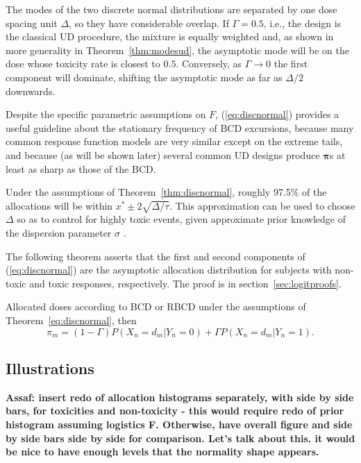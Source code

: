 The modes of the two discrete normal distributions are separated by one dose spacing unit $\Delta$, so they have considerable overlap. If $\Gamma=0.5$, i.e., the design is the classical UD procedure, the mixture is equally weighted and, as shown in more generality in Theorem~\ref{thm:modesud}, the asymptotic mode will be on the dose whose toxicity rate is closest to $0.5$. Conversely, as $\Gamma\to 0$ the first component will dominate, shifting the asymptotic mode as far as $\Delta/2$ downwards.

Despite the specific parametric assumptions on $F$,  (\ref{eq:discnormal}) provides a useful guideline about the stationary frequency of BCD excursions, because many common response function models are very similar except on the extreme tails, and because (as will be shown later) several common UD designs produce $\boldsymbol{\pi}$s at least as sharp as those of the BCD.

Under the assumptions of Theorem~\ref{thm:discnormal}, roughly 97.5\% of the allocations will be within $x^*\pm 2\sqrt{\Delta/\tau}$.  This approximation can be used to choose $\Delta$ so as to control for highly toxic events, given approximate prior knowledge of the dispersion parameter $\sigma$ \citep{Durh:Flou:Rose:rand:1997}.

The following theorem asserts that the first and second components of (\ref{eq:discnormal}) are the asymptotic allocation distribution for subjects with non-toxic and toxic responses, respectively.  The proof is in section~\ref{sec:logitproofs}.
\begin{thm}\label{thm:logitpi|y}
Allocated doses according to BCD or RBCD under the assumptions of Theorem~\ref{eq:discnormal}, then
\begin{equation}
\pi_m=(1-\Gamma)P(X_n=d_m|Y_n=0)+\Gamma P(X_n=d_m|Y_n=1).
\end{equation}
\end{thm}


\subsection{Illustrations}
{\bf Assaf: insert redo of allocation histograms separately, with side by side bars, for toxicities and non-toxicity - this would require redo of prior histogram assuming logistics F.  Otherwise, have overall figure and side by side bars side by side for comparison.  Let's talk about this. it would be nice to have enough levels that the normality shape appears.}



